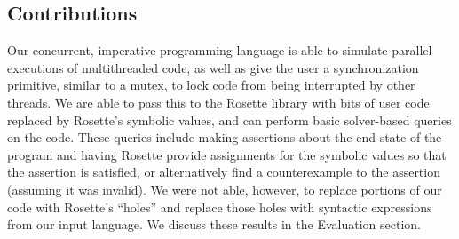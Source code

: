 \subsection{Contributions}
Our concurrent, imperative programming language is able to simulate parallel executions of multithreaded code, as well as give the user a synchronization primitive, similar to a mutex, to lock code from being interrupted by other threads.  We are able to pass this to the Rosette library with bits of user code replaced by Rosette's symbolic values, and can perform basic solver-based queries on the code.  These queries include making assertions about the end state of the program and having Rosette provide assignments for the symbolic values so that the assertion is satisfied, or alternatively find a counterexample to the assertion (assuming it was invalid).  We were not able, however, to replace portions of our code with Rosette's ``holes'' and replace those holes with syntactic expressions from our input language.  We discuss these results in the Evaluation section.
